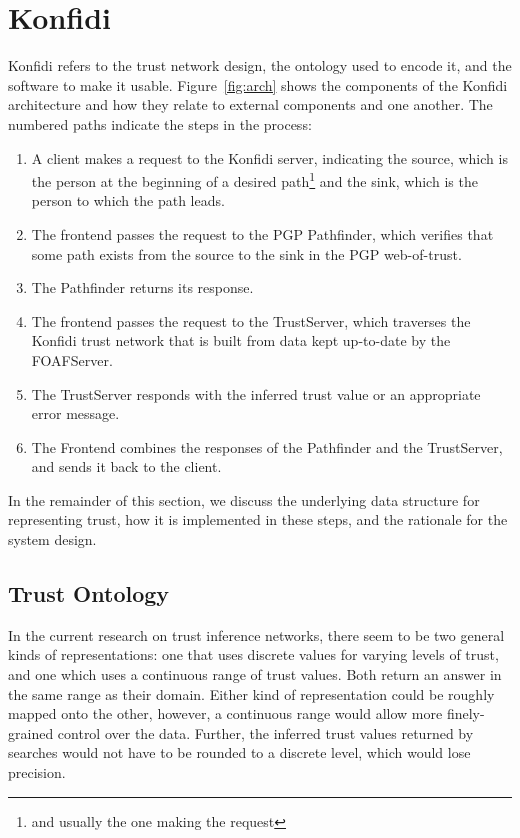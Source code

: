 \documentclass{acm_proc_article-sp}
\begin{document}
\section{Konfidi}

Konfidi refers to the trust network design, the ontology used to encode it, and the software to make it usable.  Figure~\ref{fig:arch} shows the components of the Konfidi architecture and how they relate to external components and one another.  The numbered paths indicate the steps in the process:  

\begin{enumerate}
\item  A client makes a request to the Konfidi server, indicating the source, which is the person at the beginning of a desired path\footnote{and usually the one making the request} and the sink, which is the person to which the path leads.
\item  The frontend passes the request to the PGP Pathfinder, which verifies that some path exists from the source to the sink in the PGP web-of-trust.
\item  The Pathfinder returns its response.
\item  The frontend passes the request to the TrustServer, which traverses the Konfidi trust network that is built from data kept up-to-date by the FOAFServer.
\item  The TrustServer responds with the inferred trust value or an appropriate error message.
\item  The Frontend combines the responses of the Pathfinder and the TrustServer, and sends it back to the client.
\end{enumerate}

In the remainder of this section, we discuss the underlying data structure for representing trust, how it is implemented in these steps, and the rationale for the system design.

\subsection{Trust Ontology}
In the current research on trust inference networks, there seem to be two general kinds of representations:  one that uses discrete values for varying levels of trust, and one which uses a continuous range of trust values.  Both return an answer in the same range as their domain.  Either kind of representation could be roughly mapped onto the other, however, a continuous range would allow more finely-grained control over the data.  Further, the inferred trust values returned by searches would not have to be rounded to a discrete level, which would lose precision.
\end{document}
